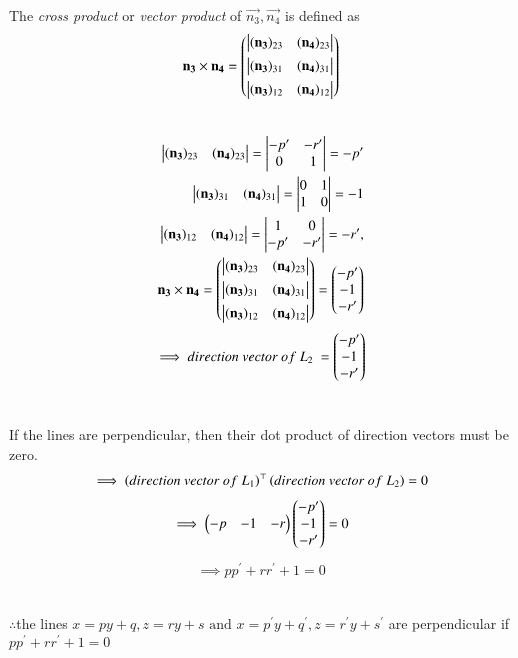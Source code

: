 \documentclass[journal]{IEEEtran}
\begin{document}
The {\em cross product} or {\em vector product} of $\vec{n_3}, \vec{n_4}$ is defined as
\begin{align}
  \label{eq:cross3d}
	\mathbf{n_3} \times \mathbf{n_4} 
	 = \begin{pmatrix} \begin{vmatrix}(\mathbf{n_3})_{23} & (\mathbf{n_4})_{23}\end{vmatrix} \\[1ex] \begin{vmatrix}(\mathbf{n_3})_{31} & (\mathbf{n_4})_{31}\end{vmatrix} \\[1ex] \begin{vmatrix}(\mathbf{n_3})_{12}  & (\mathbf{n_4})_{12}\end{vmatrix}\end{pmatrix}
\end{align}\\
\begin{align}
	\begin{vmatrix}(\mathbf{n_3})_{23}&(\mathbf{n_4})_{23}\end{vmatrix}=\begin{vmatrix}-p^{\prime} & -r^{\prime} \\ 0 & 1\end{vmatrix}=-p^{\prime}\\\
	\begin{vmatrix}(\mathbf{n_3})_{31}&(\mathbf{n_4})_{31}\end{vmatrix}=\begin{vmatrix}0 & 1 \\ 1 & 0\end{vmatrix}=-1\\
	\begin{vmatrix}(\mathbf{n_3})_{12}&(\mathbf{n_4})_{12}\end{vmatrix}=\begin{vmatrix}1 & 0 \\ -p^{\prime} & -r^{\prime}\end{vmatrix}=-r^{\prime},
	\\
	\mathbf{n_3}\times\mathbf{n_4}
	 =\begin{pmatrix} \begin{vmatrix}(\mathbf{n_3})_{23} & (\mathbf{n_4})_{23}\end{vmatrix} \\[1ex] \begin{vmatrix}(\mathbf{n_3})_{31} & (\mathbf{n_4})_{31}\end{vmatrix} \\[1ex] \begin{vmatrix}(\mathbf{n_3})_{12}  & (\mathbf{n_4})_{12}\end{vmatrix}\end{pmatrix}
=\begin{pmatrix}-p^{\prime}\\-1\\-r^{\prime}\end{pmatrix}
\end{align}
\begin{align}
    \implies direction\ vector\ of\ L_2\ = \begin{pmatrix}-p^{\prime}\\-1\\-r^{\prime}\end{pmatrix}
\end{align}\\
\bigskip

If the lines are perpendicular, then their dot product of direction vectors must be zero.
\begin{align}
    \implies \brak{direction\ vector\ of\ L_1}^\top\brak{direction\ vector\ of\ L_2} = 0
\end{align}
\begin{align}
\implies \begin{pmatrix}-p & -1 & -r\end{pmatrix} \begin{pmatrix}-p^{\prime}\\-1\\-r^{\prime}\end{pmatrix} = 0
\end{align}
\begin{align}
\implies pp^{\prime}+rr^{\prime}+1=0
\end{align}\\
\bigskip

$\therefore$the lines $x=py+q , z=ry+s \text{ and } x=p^{\prime}y+q^{\prime}, z=r^{\prime}y+s^{\prime} $ are perpendicular if $pp^{\prime}+rr^{\prime}+1=0$
\end{document}
